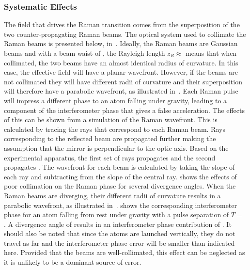 \subsubsection{Systematic Effects}
The field that drives the Raman transition comes from the
superposition of the two counter-propagating Raman beams. The optical
system used to collimate the Raman beams is presented below,
in~. Ideally,
the Raman beams are Gaussian beams and with a beam
waist of , the Rayleigh length $z_R \approx
$  means that when collimated, the two beams have an
almost identical radius of curvature. In this case, the effective field will have a planar wavefront.
However, if the beams are not collimated they will have different
radii of curvature and their superposition will therefore
have a parabolic wavefront, as illustrated
in~. Each Raman pulse will impress a different
phase to an atom falling under gravity, leading to a component of the
interferometer phase that gives a false acceleration. The effects of
this can be shown from a simulation of the Raman wavefront. This is
calculated by tracing the rays that correspond to each Raman beam.
Rays corresponding to the reflected beam are propagated further making
the assumption that the mirror is perpendicular to the optic axis.
Based on the experimental apparatus, the first set of rays propagates  and the second propagates . 
The wavefront for each beam is calculated by taking the slope of each
ray and subtracting from the slope of the central ray. 
 shows the effects of poor
collimation on the Raman phase for several divergence
angles. When the Raman beams are diverging, their different radii of
curvature results in a parabolic wavefront, as illustrated
in~.  
 shows the corresponding interferometer phase for an
atom falling from rest under gravity with a pulse separation of $T=$
. A divergence angle of
 results in an interferometer phase
contribution of . It should also be noted
that since the atoms are launched vertically, they do not travel as
far and the interferometer phase error will be
smaller than indicated here. Provided that the beams are
well-collimated, this effect can be neglected as it is
unlikely to be a dominant source of error. 
